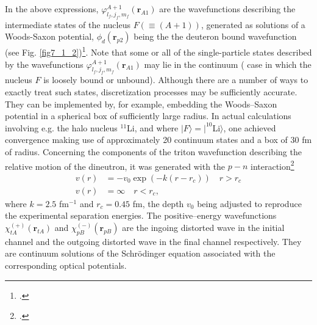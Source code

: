 In the above expressions, $\varphi^{A+1}_{l_f,j_f,m_f}(\mathbf r_{A1})$ are the wavefunctions describing the intermediate states of the nucleus $F(\equiv (A+1))$, generated as solutions of a Woods-Saxon potential,  $\phi_d(\mathbf r_{p2})$ being the  the deuteron bound wavefunction (see Fig. \ref{fig7_1_2})\footnote{\cite{Tang:65}.}. Note that some or all of the single-particle states described by the wavefunctions $\varphi^{A+1}_{l_f,j_f,m_f}(\mathbf r_{A1})$ may lie in the continuum ( case in which the nucleus $F$ is loosely bound or unbound). Although there are a number of ways to exactly treat such states, discretization processes may be sufficiently	accurate. They can be implemented by, for example,  embedding the Woods--Saxon potential in a spherical box of sufficiently large  radius. In actual calculations involving e.g. the halo nucleus $^{11}$Li, and where $|F\rangle=|^{10}$Li$\rangle$, one achieved convergence making use of approximately  20 continuum states and a box of 30 fm of radius. Concerning the components of the triton wavefunction describing the relative motion of the dineutron, it was  generated with the $p-n$ interaction\footnote{ \cite{Tang:65}.}
\begin{align}\label{eq7_1_6}
v(r)&=-v_0\exp\left(-k(r-r_c)\right) \quad r>r_c\\
v(r)&=\infty \quad r<r_c,
\end{align}
where $k=2.5$ fm$^{-1}$ and $r_c=0.45$ fm, the depth $v_0$ being adjusted to reproduce the experimental separation energies.
The positive--energy wavefunctions  $\chi^{(+)}_{tA}(\mathbf{r}_{tA})$ and $\chi^{(-)}_{pB}(\mathbf{r}_{pB})$ are the ingoing distorted wave in the initial channel and the outgoing distorted wave in the final channel respectively. They are continuum solutions of the Schr\"{o}dinger equation associated with the corresponding optical potentials.


